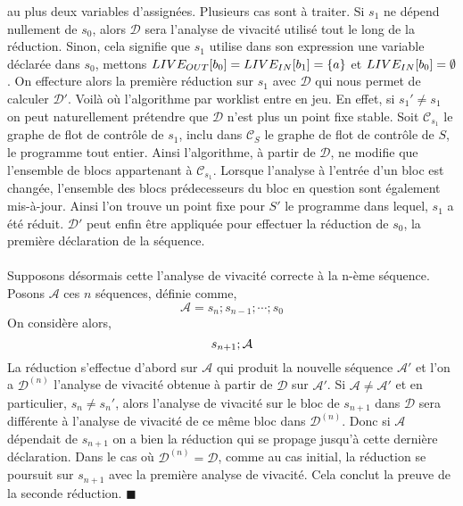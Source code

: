 \documentclass[a4paper, 12pt]{article}
\begin{document}
au plus deux variables d'assignées.
Plusieurs cas sont à traiter. Si $s_1$ ne dépend nullement de $s_0$, alors $\mathcal{D}$ sera l'analyse de vivacité utilisé tout le long
de la réduction.
Sinon, cela signifie que $s_1$ utilise dans son expression une variable déclarée dans $s_0$, mettons $LIVE_{OUT}[b_0] = LIVE_{IN}[b_1] = \{a\}$ et
$LIVE_{IN}[b_0] = \emptyset$. On effecture alors la première réduction sur $s_1$ avec $\mathcal{D}$ qui nous permet de calculer $\mathcal{D}'$.
Voilà où l'algorithme par worklist entre en jeu. En effet, si $s_1' \ne s_1$ on peut naturellement prétendre que $\mathcal{D}$ n'est plus un point fixe
stable. Soit $\mathcal{C}_{s_1}$ le graphe de flot de contrôle de $s_1$, inclu dans $\mathcal{C}_{S}$ le graphe de flot de contrôle de $S$, le programme
tout entier. Ainsi l'algorithme, à partir de $\mathcal{D}$, ne modifie que l'ensemble de blocs appartenant à $\mathcal{C}_{s_1}$. Lorsque l'analyse à
l'entrée d'un bloc est changée, l'ensemble des blocs prédecesseurs du bloc en question sont également mis-à-jour. Ainsi l'on trouve un
point fixe pour $S'$ le programme dans lequel, $s_1$ a été réduit. $\mathcal{D}'$ peut enfin être appliquée pour effectuer la réduction de $s_0$, la première
déclaration de la séquence.
\\
\\
Supposons désormais cette l'analyse de vivacité correcte à la n-ème séquence. Posons $\mathcal{A}$ ces $n$ séquences, définie comme,
\[\mathcal{A} = s_n ; s_{n-1} ; \cdots ; s_0\]
On considère alors,
\[{s_{n + 1}}\space;\space{\mathcal{A}}\]
La réduction s'effectue d'abord sur $\mathcal{A}$ qui produit la nouvelle séquence $\mathcal{A}'$ et l'on a $\mathcal{D}^{(n)}$ l'analyse de vivacité obtenue à 
partir de $\mathcal{D}$ sur $\mathcal{A}'$.
Si $\mathcal{A}\ne\mathcal{A}'$ et en particulier, $s_n \ne s_n'$, alors l'analyse de vivacité sur le bloc de $s_{n+1}$ dans $\mathcal{D}$ sera différente
à l'analyse de vivacité de ce même bloc dans $\mathcal{D}^{(n)}$. Donc si $\mathcal{A}$ dépendait de $s_{n+1}$ on a bien la réduction qui se propage jusqu'à
cette dernière déclaration.
Dans le cas où $\mathcal{D}^{(n)}=\mathcal{D}$, comme au cas initial, la réduction se poursuit sur $s_{n+1}$ avec la première analyse de vivacité. Cela conclut
la preuve de la seconde réduction.
\hfill $\blacksquare$
\end{document}
